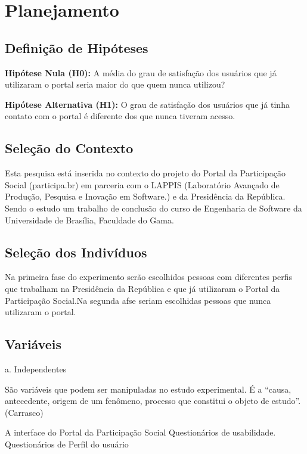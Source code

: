 \section{Planejamento}

\subsection{Definição de Hipóteses}

\textbf{Hipótese Nula (H0):} A média do grau de satisfação dos usuários que já utilizaram o portal seria maior do que quem nunca utilizou?

\textbf{Hipótese Alternativa (H1):} O grau de satisfação dos usuários que já tinha contato com o portal é diferente dos que nunca tiveram acesso.



\subsection{Seleção do Contexto}

Esta pesquisa está inserida no contexto do projeto do Portal da Participação Social (participa.br) em parceria com o LAPPIS (Laboratório Avançado de Produção, Pesquisa e Inovação em Software.) e da Presidência da República. Sendo o estudo um trabalho de conclusão do curso de Engenharia de Software da Universidade de Brasília, Faculdade do Gama.

\subsection{Seleção dos Indivíduos}

	Na primeira fase do experimento serão escolhidos pessoas com diferentes perfis que trabalham na Presidência da República e que já utilizaram o Portal da Participação Social.Na segunda afse seriam escolhidas pessoas que nunca utilizaram o portal.

\subsection{Variáveis}
 
a. Independentes

São variáveis que podem ser manipuladas no estudo experimental. É a “causa, antecedente, origem de um fenômeno, processo que constitui o objeto de estudo”.(Carrasco)


A interface do Portal da Participação Social
Questionários de usabilidade.
Questionários de Perfil do usuário

